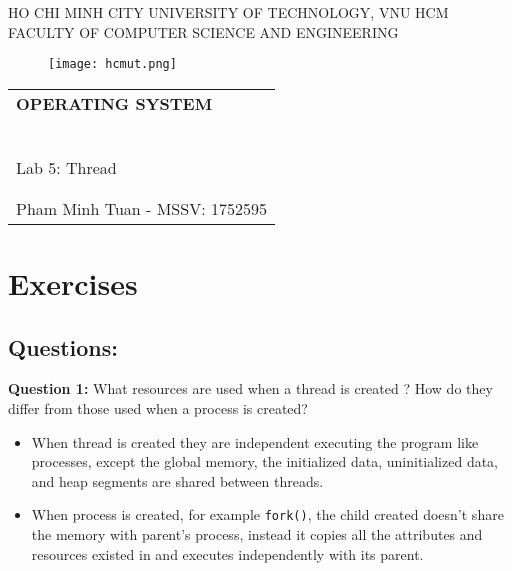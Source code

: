 \documentclass[a4paper]{article}
\begin{document}
    \begin{titlepage}
        \begin{center}
            HO CHI MINH CITY UNIVERSITY OF TECHNOLOGY, VNU HCM \\
            FACULTY OF COMPUTER SCIENCE AND ENGINEERING
        \end{center}

        \vspace{1cm}

        \begin{figure}[h!]
            \begin{center}
                \texttt{[image: hcmut.png]}
            \end{center}
        \end{figure}

        \vspace{1cm}

        \begin{center}
            \begin{tabular}{c}
                \multicolumn{1}{l}{\textbf{\LARGE OPERATING SYSTEM}} \\
                ~~\\
                \hline
                \\
                \multicolumn{1}{l}{\LARGE Lab 5: Thread} \\
                \\
                \hline
                \\
                \hspace{5cm} Pham Minh Tuan - MSSV: 1752595
            \end{tabular}
        \end{center}
    \end{titlepage}

\newpage

\section{Exercises}

\subsection{Questions:}

\textbf{Question 1:} What resources are used when a thread is created ? How do they differ from those used when a process is created?

\begin{itemize}
    \item When thread is created they are independent executing the program like processes, except the global memory, the initialized data, uninitialized data, and heap segments are shared between threads.
    \item When process is created, for example \texttt{fork()}, the child created doesn't share the memory with parent's process, instead it copies all the attributes and resources existed in and executes independently with its parent.  
\end{itemize}
\end{document}
